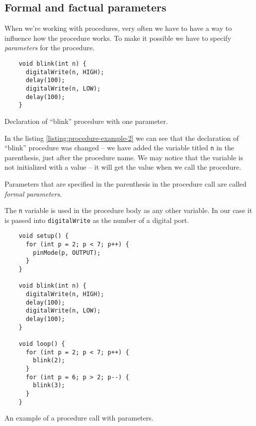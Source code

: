 \documentclass[../sparc.tex]{subfiles}
\begin{document}
\subsection{Formal and factual parameters}

When we're working with procedures, very often we have to have a way to
influence how the procedure works.  To make it possible we have to specify
\emph{parameters} for the procedure.

\begin{listing}[H]
  \begin{verbatim}
    void blink(int n) {
      digitalWrite(n, HIGH);
      delay(100);
      digitalWrite(n, LOW);
      delay(100);
    }
  \end{verbatim}
  \label{listing:procedure-example-2}
  \caption{Declaration of ``blink'' procedure with one parameter.}
\end{listing}

In the listing \ref{listing:procedure-example-2} we can see that the declaration
of ``blink'' procedure was changed -- we have added the variable titled
\texttt{n} in the parenthesis, just after the procedure name.  We may
notice that the variable is not initialized with a value -- it will get the value
when we call the procedure.

Parameters that are specified in the parenthesis in the procedure call are
called \emph{formal parameters}.

The \texttt{n} variable is used in the procedure body as any other
variable.  In our case it is passed into \texttt{digitalWrite} as the
number of a digital port.

\begin{listing}[H]
  \begin{verbatim}
    void setup() {
      for (int p = 2; p < 7; p++) {
        pinMode(p, OUTPUT);
      }
    }

    void blink(int n) {
      digitalWrite(n, HIGH);
      delay(100);
      digitalWrite(n, LOW);
      delay(100);
    }

    void loop() {
      for (int p = 2; p < 7; p++) {
        blink(2);
      }
      for (int p = 6; p > 2; p--) {
        blink(3);
      }
    }
  \end{verbatim}
  \label{listing:procedure-example-3}
  \caption{An example of a procedure call with parameters.}
\end{listing}
\end{document}
